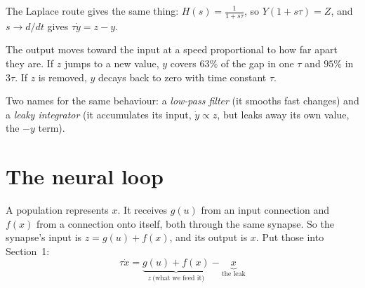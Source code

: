\documentclass[11pt,letterpaper]{article}
\begin{document}
The Laplace route gives the same thing: $H(s) = \frac{1}{1 + s\tau}$, so $Y(1 + s\tau) = Z$, and $s \to d/dt$ gives $\tau\dot y = z - y$.

\begin{howto}
The output moves toward the input at a speed proportional to how far apart they are. If $z$ jumps to a new value, $y$ covers $63\%$ of the gap in one $\tau$ and $95\%$ in $3\tau$. If $z$ is removed, $y$ decays back to zero with time constant $\tau$.

Two names for the same behaviour: a \emph{low-pass filter} (it smooths fast changes) and a \emph{leaky integrator} (it accumulates its input, $\dot y \propto z$, but leaks away its own value, the $-y$ term).
\end{howto}

\begin{center}
\end{center}

\section{The neural loop}

A population represents $x$. It receives $g(u)$ from an input connection and $f(x)$ from a connection onto itself, both through the same synapse. So the synapse's input is $z = g(u) + f(x)$, and its output is $x$. Put those into Section~1:
\[
\boxed{\ \tau\dot x = \underbrace{g(u) + f(x)}_{z\ \text{(what we feed it)}} - \underbrace{x}_{\text{the leak}}\ }
\]
\end{document}
